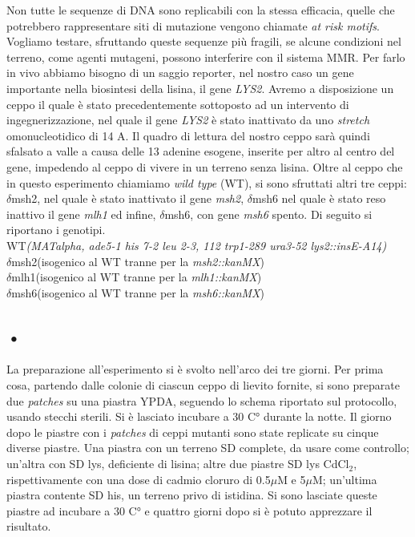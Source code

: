  Non tutte le sequenze di DNA sono replicabili con la stessa efficacia, quelle che potrebbero rappresentare siti di mutazione vengono chiamate \textit{at risk motifs}.  Vogliamo testare, sfruttando queste sequenze più fragili, se alcune condizioni nel terreno, come agenti mutageni, possono interferire con il sistema MMR. Per farlo in vivo abbiamo bisogno di un saggio reporter, nel nostro caso un gene importante nella biosintesi della lisina, il gene \textit{LYS2}. Avremo a disposizione un ceppo il quale è stato precedentemente sottoposto ad un intervento di ingegnerizzazione, nel quale il gene \textit{LYS2} è stato inattivato da uno \textit{stretch} omonucleotidico di 14 A. Il quadro di lettura del nostro ceppo sarà quindi sfalsato a valle a causa delle 13 adenine esogene, inserite per altro al centro del gene, impedendo al ceppo di vivere in un terreno senza lisina. Oltre al ceppo che in questo esperimento chiamiamo \textit{wild type} (WT), si sono sfruttati altri tre ceppi: $\delta$msh2, nel quale è stato inattivato il gene \textit{msh2}, $\delta$msh6 nel quale è stato reso inattivo il gene \textit{mlh1} ed infine, $\delta$msh6, con gene \textit{msh6} spento. Di seguito si riportano i genotipi. \\
WT\textit{(MATalpha, ade5-1 his 7-2 leu 2-3, 112 trp1-289 ura3-52 lys2::insE-A14)} \\
$\delta$msh2(isogenico al WT tranne per la \textit{msh2::kanMX}) \\
$\delta$mlh1(isogenico al WT tranne per la \textit{mlh1::kanMX}) \\
$\delta$msh6(isogenico al WT tranne per la \textit{msh6::kanMX})
 
 
 \subsection*{•}
 La preparazione all'esperimento si è svolto nell'arco dei tre giorni. Per prima cosa, partendo dalle colonie di ciascun ceppo di lievito fornite, si sono preparate due \textit{patches} su una piastra YPDA, seguendo lo schema riportato sul protocollo, usando stecchi sterili. Si è lasciato incubare a 30 C° durante la notte. Il giorno dopo le piastre con i \textit{patches} di ceppi mutanti sono state replicate su cinque diverse piastre. Una piastra con un terreno SD complete, da usare come controllo; un'altra con SD lys, deficiente di lisina; altre due piastre SD lys CdCl$_{2}$, rispettivamente con una dose di cadmio cloruro di 0.5$\mu$M e 5$\mu$M; un'ultima piastra contente SD his, un terreno privo di istidina. Si sono lasciate queste piastre ad incubare a 30 C° e quattro giorni dopo si è potuto apprezzare il risultato.
 
